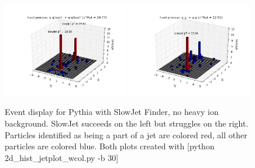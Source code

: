 \documentclass[11pt]{article}
\begin{document}
\begin{figure}[h]
\begin{center}
\includegraphics[width=0.49\textwidth]{2d_hist_jetplot_wcol.png}
\includegraphics[width=0.49\textwidth]{2d_hist_jetplot_wcol2.png}
\label{fig_label}
\caption{Event display for Pythia with SlowJet Finder, no heavy ion background.  SlowJet succeeds on the left but struggles on the right. Particles identified as being a part of a jet are colored red, all other particles are colored blue. Both plots created with [python 2d\_hist\_jetplot\_wcol.py -b 30]}
\end{center}
\end{figure}
\end{document}
